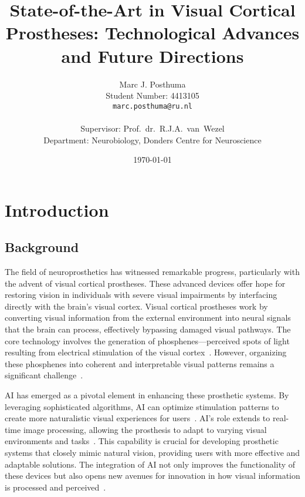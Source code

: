 \documentclass[twocolumn,10pt]{article}
\title{State-of-the-Art in Visual Cortical Prostheses: Technological Advances and Future Directions}
\author{
  Marc J. Posthuma\\
  Student Number: 4413105\\
  \texttt{marc.posthuma@ru.nl}\\
  \\
  Supervisor: Prof.\ dr.\ R.J.A.\ van\ Wezel\\
  Department: Neurobiology, Donders Centre for Neuroscience
}
\date{\today}
\begin{document}

\section{Introduction}\label{sec:intro}
\subsection{Background}
The field of neuroprosthetics has witnessed remarkable progress, particularly
with the advent of visual cortical prostheses. These advanced devices offer hope
for restoring vision in individuals with severe visual impairments by
interfacing directly with the brain's visual cortex. Visual cortical prostheses
work by converting visual information from the external environment into neural
signals that the brain can process, effectively bypassing damaged visual
pathways. The core technology involves the generation of phosphenes---perceived
spots of light resulting from electrical stimulation of the visual
cortex~\cite{vandergrintenBiologicallyPlausiblePhosphene2024}. However,
organizing these phosphenes into coherent and interpretable visual patterns
remains a significant challenge~\cite{merabetWhatBlindnessCan2005}.

AI has emerged as a pivotal element in enhancing these prosthetic systems. By
leveraging sophisticated algorithms, AI can optimize stimulation patterns to
create more naturalistic visual experiences for
users~\cite{kriegeskorteDeepNeuralNetworks2015}. AI's role extends to real-time
image processing, allowing the prosthesis to adapt to varying visual
environments and tasks~\cite{marblestoneIntegrationDeepLearning2016}. This
capability is crucial for developing prosthetic systems that closely mimic
natural vision, providing users with more effective and adaptable solutions. The
integration of AI not only improves the functionality of these devices but also
opens new avenues for innovation in how visual information is processed and
perceived~\cite{gallettiCorticalConnectionsArea2001}.
\end{document}
